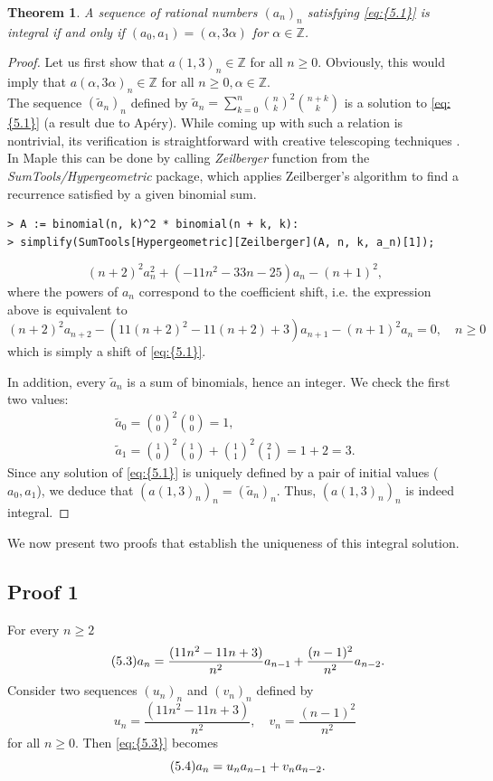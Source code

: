 \documentclass[11pt]{article}
\theoremstyle{definition}
\theoremstyle{plain}
\newtheorem{thm}[defi]{Theorem}
\theoremstyle{remark}
\begin{document}
\begin{thm}\label{thm:7.1}
A sequence of rational numbers $(a_n)_n$ satisfying \eqref{eq:{5.1}} is integral if and only if $(a_0,a_1) = (\alpha, 3\alpha)$ for $\alpha \in \mathbb{Z}$.
\end{thm}
\begin{proof}
Let us first show that $a(1,3)_n \in \mathbb{Z}$ for all $n \geq 0$. Obviously, this would imply that $a(\alpha,3\alpha)_n \in \mathbb{Z}$ for all $n \geq 0, \alpha \in \mathbb{Z}$. \\
The sequence $(\tilde{a}_n)_n$ defined by $\tilde{a}_n = \sum\limits_{k=0}^{n} \binom{n}{k}^2 \binom{n+k}{k}$ is a solution to \eqref{eq:{5.1}} (a result due to Apéry). While coming up with such a relation is nontrivial, its verification is straightforward with creative telescoping techniques \cite{zeilberger1991CT}. In Maple this can be done by calling \textit{Zeilberger} function from the \textit{SumTools/Hypergeometric} package, which applies Zeilberger's algorithm to find a recurrence satisfied by a given binomial sum.
\begin{verbatim}
> A := binomial(n, k)^2 * binomial(n + k, k):
> simplify(SumTools[Hypergeometric][Zeilberger](A, n, k, a_n)[1]);
\end{verbatim}
\[(n + 2)^2 a_n^2 + (-11n^2 - 33n - 25)a_n - (n + 1)^2,\]
where the powers of $a_n$ correspond to the coefficient shift, i.e. the expression above is equivalent to \[(n+2)^2a_{n+2} -(11(n+2)^2-11(n+2)+3)a_{n+1}-(n+1)^2a_n=0, \quad n \geq 0\]
which is simply a shift of \eqref{eq:{5.1}}.

In addition, every $\tilde{a}_n$ is a sum of binomials, hence an integer. We check the first two values:
\begin{align*}
\tilde{a}_0 = \binom{0}{0}^2 \binom{0}{0} = 1, \\
\tilde{a}_1 = \binom{1}{0}^2 \binom{1}{0} + \binom{1}{1}^2 \binom{2}{1} = 1+2 = 3.
\end{align*}
Since any solution of \eqref{eq:{5.1}} is uniquely defined by a pair of initial values ($a_0,a_1$), we deduce that $(a(1,3)_n)_n = (\tilde{a}_n)_n$. Thus, $(a(1,3)_n)_n$ is indeed integral.
\end{proof}

We now present two proofs that establish the uniqueness of this integral solution.

\subsection{Proof 1}
For every $n \geq 2$ 
\begin{equation}\label{eq:{5.3}}\tag{5.3}
a_n = \frac{(11n^2-11n+3)}{n^2}a_{n-1} + \frac{(n-1)^2}{n^2}a_{n-2}.
\end{equation}
Consider two sequences $(u_n)_n$ and $(v_n)_n$ defined by
\[u_n = \frac{(11n^2-11n+3)}{n^2}, \quad v_n = \frac{(n-1)^2}{n^2}\]
for all $n \geq 0$. Then \eqref{eq:{5.3}} becomes
\begin{equation}\label{eq:{5.4}}\tag{5.4}
a_n = u_na_{n-1} + v_na_{n-2}.
\end{equation}
\end{document}
